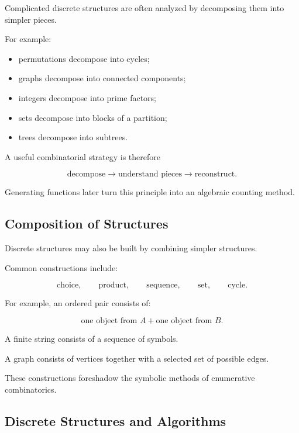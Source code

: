 Complicated discrete structures are often analyzed by decomposing them
into simpler pieces.

For example:

\begin{itemize}
    \item permutations decompose into cycles;
    \item graphs decompose into connected components;
    \item integers decompose into prime factors;
    \item sets decompose into blocks of a partition;
    \item trees decompose into subtrees.
\end{itemize}

A useful combinatorial strategy is therefore

\[
\boxed{
\text{decompose}
\longrightarrow
\text{understand pieces}
\longrightarrow
\text{reconstruct}.
}
\]

Generating functions later turn this principle into an algebraic
counting method.

\subsection{Composition of Structures}
\label{subsec:composition-discrete-structures}

Discrete structures may also be built by combining simpler structures.

Common constructions include:

\[
\boxed{
\text{choice},
\qquad
\text{product},
\qquad
\text{sequence},
\qquad
\text{set},
\qquad
\text{cycle}.
}
\]

For example, an ordered pair consists of:

\[
\text{one object from }A
+
\text{one object from }B.
\]

A finite string consists of a sequence of symbols.

A graph consists of vertices together with a selected set of possible
edges.

These constructions foreshadow the symbolic methods of enumerative
combinatorics.

\subsection{Discrete Structures and Algorithms}
\label{subsec:discrete-structures-algorithms}

